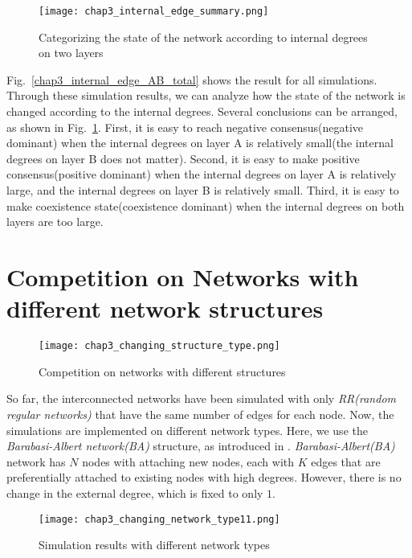 \begin{figure}[!htb]
	\centering
	\texttt{[image: chap3\_internal\_edge\_summary.png]}
	\caption{Categorizing the state of the network according to internal degrees on two layers}
	\label{chap3_internal_edge_summary}
\end{figure}

Fig.~\ref{chap3_internal_edge_AB_total} shows the result for all simulations. Through these simulation results, we can analyze how the state of the network is changed according to the internal degrees. Several conclusions can be arranged, as shown in Fig.~\ref{chap3_internal_edge_summary}.  First, it is easy to reach negative consensus(negative dominant) when the internal degrees on layer A is relatively small(the internal degrees on layer B does not matter). Second, it is easy to make positive consensus(positive dominant) when the internal degrees on layer A is relatively large, and the internal degrees on layer B is relatively small. Third, it is easy to make coexistence state(coexistence dominant) when the internal degrees on both layers are too large. \\ 

\section{Competition on Networks with different network structures}
\begin{figure}[!htb]
	\centering
	\texttt{[image: chap3\_changing\_structure\_type.png]}
	\caption{Competition on networks with different structures}
	\label{chap3_changing_structure_type}
\end{figure}
So far, the interconnected networks have been simulated with only \textit{RR(random regular networks)} that have the same number of edges for each node. Now, the simulations are implemented on different network types. Here, we use the \textit{Barabasi-Albert network(BA)} structure, as introduced in \parencite{barabasi1999}. \textit{Barabasi-Albert(BA)} network has $N$ nodes with attaching new nodes, each with $K$ edges that are preferentially attached to existing nodes with high degrees. However, there is no change in the external degree, which is fixed to only $1$.

\begin{figure}[!htb]
	\centering
	\texttt{[image: chap3\_changing\_network\_type11.png]}
	\caption{Simulation results with different network types}
	\label{chap3_changing_network_type1}
\end{figure}

